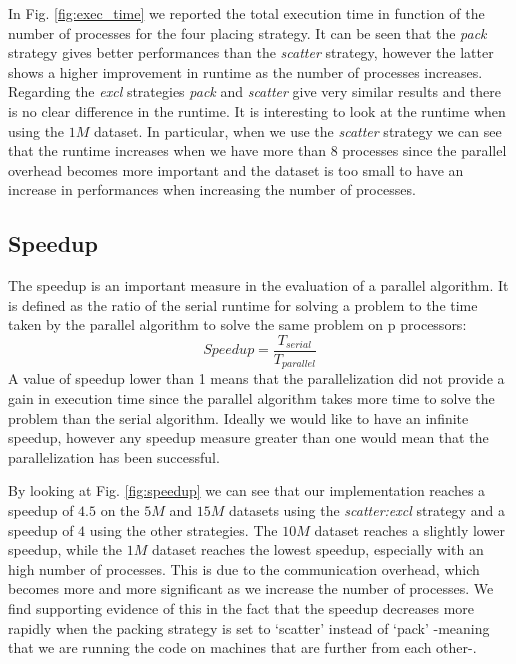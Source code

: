 In Fig. \ref{fig:exec_time} we reported the total execution time in function of the number of processes for the four placing strategy.
It can be seen that the \textit{pack} strategy gives better performances than the \textit{scatter} strategy, however
the latter shows a higher improvement in runtime as the number of processes increases. Regarding the \textit{excl} strategies
\textit{pack} and \textit{scatter} give very similar results and there is no clear difference in the runtime.
It is interesting to look at the runtime when using the $1M$ dataset. In particular, when we use the \textit{scatter} strategy we can
see that the runtime increases when we have more than $8$ processes since the parallel overhead becomes more important and the dataset is too
small to have an increase in performances when increasing the number of processes.

\subsection{Speedup}
The speedup is an important measure in the evaluation of a parallel algorithm.
It is defined as the ratio of the serial runtime for solving a problem to the time taken by the
parallel algorithm to solve the same problem on p processors:
\begin{equation}
    Speedup = \frac{T_{serial}}{T_{parallel}}
\end{equation}
A value of speedup lower than 1 means that the parallelization did not provide a gain in execution time
since the parallel algorithm takes more time to solve the problem than the serial algorithm.
Ideally we would like to have an infinite speedup, however any speedup measure greater than one would
mean that the parallelization has been successful.

By looking at Fig. \ref{fig:speedup} we can see that our implementation reaches a speedup of $4.5$ on the
$5M$ and $15M$ datasets using the \textit{scatter:excl} strategy and a speedup of $4$ using the other strategies.
The $10M$ dataset reaches a slightly lower speedup, while the $1M$ dataset reaches the lowest speedup, especially
with an high number of processes. This is due to the communication overhead, which becomes more and more significant as we increase the number of processes. We find supporting evidence of this in the fact that the speedup decreases more rapidly when the packing strategy is set to `scatter' instead of `pack' -meaning that we are running the code on machines that are further from each other-.


